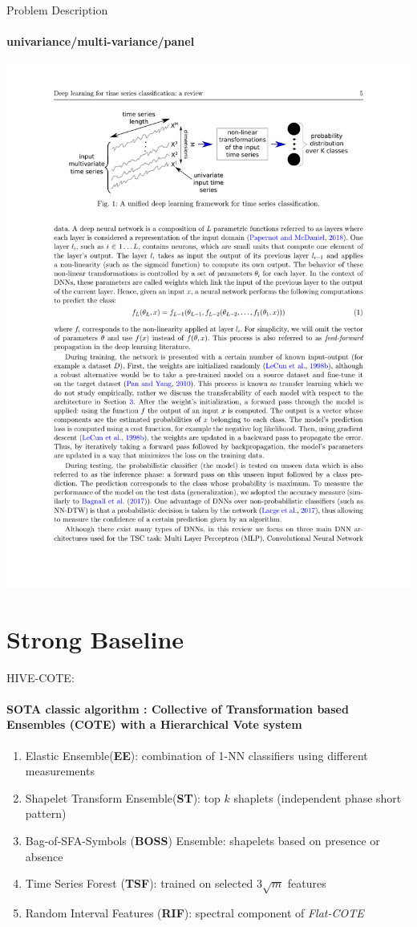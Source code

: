 \documentclass[aspectratio=169]{ctexbeamer}
\begin{document}
\begin{frame}{Problem Description}
	\framesubtitle{univariance/multi-variance/panel}
	\begin{center}
		\includegraphics[width=\textwidth]{figure/base_formula}
	\end{center}
\end{frame}

\section{Strong Baseline}
\begin{frame}{HIVE-COTE:}
	\framesubtitle{\textbf{SOTA} classic algorithm : Collective of Transformation based \textbf{Ensembles} (COTE) with a Hierarchical Vote system}
	\begin{enumerate}
		\item Elastic Ensemble(\textbf{EE}): combination of 1-NN classifiers using different measurements
		\item Shapelet Transform Ensemble(\textbf{ST}): top $k$ shaplets (independent phase short pattern)
		\item Bag-of-SFA-Symbols (\textbf{BOSS}) Ensemble: shapelets based on presence or absence
		\item Time Series Forest (\textbf{TSF}): trained on selected $3 \sqrt{m}$ features
		\item Random Interval Features (\textbf{RIF}): spectral component of \textit{Flat-COTE}
	\end{enumerate}
\end{frame}
\end{document}
